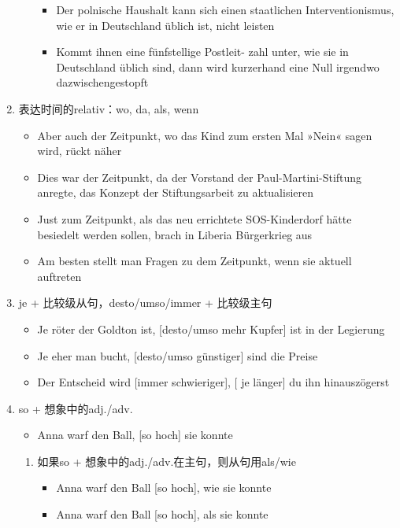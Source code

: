 \documentclass[UTF8]{report}
\begin{document}
\begin{enumerate}
\begin{enumerate}
\begin{itemize}
            \item Der polnische Haushalt kann sich einen staatlichen Interventionismus, wie er in Deutschland üblich ist, nicht leisten
            \item Kommt ihnen eine fünfstellige Postleit- zahl unter, wie sie in Deutschland üblich sind, dann wird kurzerhand eine Null irgendwo dazwischengestopft
        \end{itemize}
    \end{enumerate}
    \item 表达时间的relativ：wo, da, als, wenn
    \begin{itemize}
        \item Aber auch der Zeitpunkt, wo das Kind zum ersten Mal »Nein« sagen wird, rückt näher
        \item Dies war der Zeitpunkt, da der Vorstand der Paul-Martini-Stiftung anregte, das Konzept der Stiftungsarbeit zu aktualisieren
        \item Just zum Zeitpunkt, als das neu errichtete SOS-Kinderdorf hätte besiedelt werden sollen, brach in Liberia Bürgerkrieg aus
        \item Am besten stellt man Fragen zu dem Zeitpunkt, wenn sie aktuell auftreten
    \end{itemize}
    \item je + 比较级从句，desto/umso/immer + 比较级主句
    \begin{itemize}
        \item Je röter der Goldton ist, [desto/umso mehr Kupfer] ist in der Legierung
        \item Je eher man bucht, [desto/umso günstiger] sind die Preise
        \item Der Entscheid wird [immer schwieriger], [ je länger] du ihn hinauszögerst
    \end{itemize}
    \item so + 想象中的adj./adv.
    \begin{itemize}
        \item Anna warf den Ball, [so hoch] sie konnte
    \end{itemize}
    \begin{enumerate}
        \item 如果so + 想象中的adj./adv.在主句，则从句用als/wie
        \begin{itemize}
            \item Anna warf den Ball [so hoch], wie sie konnte
            \item Anna warf den Ball [so hoch], als sie konnte

\end{itemize}
\end{enumerate}
\end{enumerate}
\end{document}
